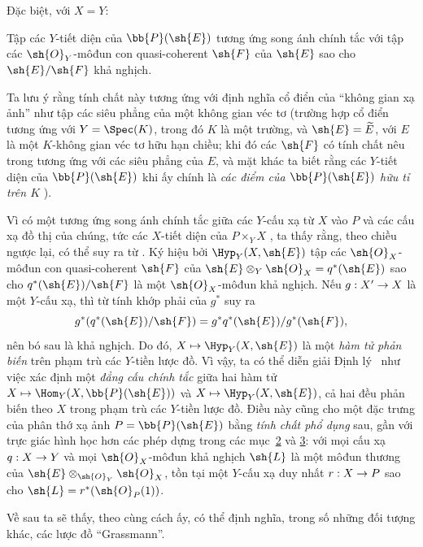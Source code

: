 \documentclass[oneside,10pt]{amsart}
\makeatletter
\newcommand{\ega@arrow}[2]{\mathchoice{#1}{#2}{#2}{#2}}
\let\ega@shortmapsto\mapsto
\renewcommand{\to}{\ega@arrow{\longrightarrow}{\rightarrow}}
\renewcommand{\mapsto}{\ega@arrow{\longmapsto}{\ega@shortmapsto}}
\let\EGAOriginalLabel\label
\renewcommand{\label}[1]{\phantomsection\EGAOriginalLabel{#1}}
\makeatother
\begin{document}
Đặc biệt, với $X=Y$:
\begin{theorem}[4.2.4]
\label{II.4.2.4}
Tập các $Y$-tiết diện của $\bb{P}(\sh{E})$ tương ứng song ánh chính tắc với tập các $\sh{O}_Y$-môđun con quasi-coherent $\sh{F}$ của $\sh{E}$ sao cho $\sh{E}/\sh{F}$ khả nghịch.
\end{theorem}

Ta lưu ý rằng tính chất này tương ứng với định nghĩa cổ điển của ``không gian xạ ảnh'' như tập các siêu phẳng của một không gian véc tơ (trường hợp cổ điển tương ứng với $Y=\Spec(K)$, trong đó $K$ là một trường, và $\sh{E}=\widetilde{E}$, với $E$ là một $K$-không gian véc tơ hữu hạn chiều; khi đó các $\sh{F}$ có tính chất nêu trong  tương ứng với các siêu phẳng của $E$, và mặt khác ta biết rằng các $Y$-tiết diện của $\bb{P}(\sh{E})$ khi ấy chính là \emph{các điểm của $\bb{P}(\sh{E})$ hữu tỉ trên $K$} ).

\begin{remark}[4.2.5]
\label{II.4.2.5}
Vì có một tương ứng song ánh chính tắc giữa các $Y$-cấu xạ từ $X$ vào $P$ và các cấu xạ đồ thị của chúng, tức các $X$-tiết diện của $P\times_Y X$ , ta thấy rằng, theo chiều ngược lại,  có thể suy ra từ .
Ký hiệu bởi $\Hyp_Y(X,\sh{E})$ tập các $\sh{O}_X$-môđun con quasi-coherent $\sh{F}$ của $\sh{E}\otimes_Y\sh{O}_X=q^*(\sh{E})$ sao cho $q^*(\sh{E})/\sh{F}$ là một $\sh{O}_X$-môđun khả nghịch.
Nếu $g:X'\to X$ là một $Y$-cấu xạ, thì từ tính khớp phải của $g^*$ suy ra
\[
  g^*(q^*(\sh{E})/\sh{F})=g^*q^*(\sh{E})/g^*(\sh{F}),
\]
nên bó sau là khả nghịch. Do đó, $X\mapsto\Hyp_Y(X,\sh{E})$ là một \emph{hàm tử phản biến} trên phạm trù các $Y$-tiền lược đồ.
Vì vậy, ta có thể diễn giải Định lý~ như việc xác định một \emph{đẳng cấu chính tắc} giữa hai hàm tử $X\mapsto\Hom_Y(X,\bb{P}(\sh{E}))$ và $X\mapsto\Hyp_Y(X,\sh{E})$, cả hai đều phản biến theo $X$ trong phạm trù các $Y$-tiền lược đồ.
Điều này cũng cho một đặc trưng của phân thớ xạ ảnh $P=\bb{P}(\sh{E})$ bằng \emph{tính chất phổ dụng} sau, gần với trực giác hình học hơn các phép dựng trong các mục~\textsection\textsection\hyperref[section:II.2]{2} và \hyperref[section:II.3]{3}:
với mọi cấu xạ $q:X\to Y$ và mọi $\sh{O}_X$-môđun khả nghịch $\sh{L}$ là một môđun thương của $\sh{E}\otimes_{\sh{O}_Y}\sh{O}_X$, tồn tại một $Y$-cấu xạ duy nhất $r:X\to P$ sao cho $\sh{L}=r^*(\sh{O}_P(1))$.

Về sau ta sẽ thấy, theo cùng cách ấy, có thể định nghĩa, trong số những đối tượng khác, các lược đồ ``Grassmann''.
\end{remark}
\end{document}
